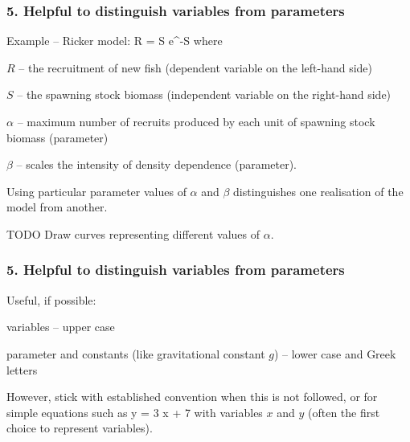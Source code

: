 \begin{frame}
\frametitle{5. Helpful to distinguish variables from parameters}

Example -- Ricker model:
\eb
\nonumber R = \alpha S \mbox{e}^{-\beta S}
\label{ricker}
\ee
where
\bi
  \item $R$ -- the recruitment of new fish (dependent variable on the left-hand
    side)
  \item $S$ -- the spawning stock biomass (independent variable on the right-hand
    side)
  \item $\alpha$ -- maximum number of recruits produced by each unit
  of spawning stock biomass (parameter)
  \item $\beta$ -- scales the intensity of density dependence (parameter).
\ei

Using particular parameter values of $\alpha$ and $\beta$ distinguishes one
realisation of the model from another.

TODO Draw curves representing different values of $\alpha$.

\end{frame}


\begin{frame}
\frametitle{5. Helpful to distinguish variables from parameters}

Useful, if possible:
\bi
 \item variables -- upper case
 \item parameter and constants (like gravitational constant $g$) -- lower case
   and Greek letters
\ei

However, stick with established convention when this is not followed, or for
simple equations such as
\eb
\nonumber y = 3 x + 7
\ee
with variables $x$ and $y$ (often the first choice to represent variables).

\end{frame}


